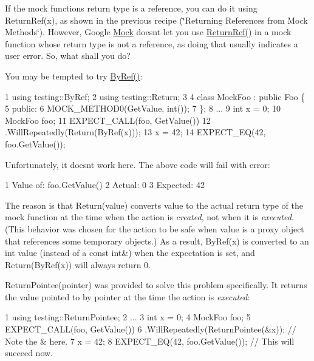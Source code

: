 If the mock function\textquotesingle{}s return type is a reference, you can do it using {\ttfamily Return\+Ref(x)}, as shown in the previous recipe (\char`\"{}\+Returning References
from Mock Methods\char`\"{}). However, Google \hyperlink{class_mock}{Mock} doesn\textquotesingle{}t let you use {\ttfamily \hyperlink{namespacetesting_a18eda8fe9c89ee856c199a2e04ca1641}{Return\+Ref()}} in a mock function whose return type is not a reference, as doing that usually indicates a user error. So, what shall you do?

You may be tempted to try {\ttfamily \hyperlink{namespacetesting_aaee6d42dcd69de6e7a1459c5c71222c3}{By\+Ref()}}\+:


\begin{DoxyCode}
1 using testing::ByRef;
2 using testing::Return;
3 
4 class MockFoo : public Foo \{
5  public:
6   MOCK\_METHOD0(GetValue, int());
7 \};
8 ...
9   int x = 0;
10   MockFoo foo;
11   EXPECT\_CALL(foo, GetValue())
12       .WillRepeatedly(Return(ByRef(x)));
13   x = 42;
14   EXPECT\_EQ(42, foo.GetValue());
\end{DoxyCode}


Unfortunately, it doesn\textquotesingle{}t work here. The above code will fail with error\+:


\begin{DoxyCode}
1 Value of: foo.GetValue()
2   Actual: 0
3 Expected: 42
\end{DoxyCode}


The reason is that {\ttfamily Return(value)} converts {\ttfamily value} to the actual return type of the mock function at the time when the action is {\itshape created}, not when it is {\itshape executed}. (This behavior was chosen for the action to be safe when {\ttfamily value} is a proxy object that references some temporary objects.) As a result, {\ttfamily By\+Ref(x)} is converted to an {\ttfamily int} value (instead of a {\ttfamily const int\&}) when the expectation is set, and {\ttfamily Return(\+By\+Ref(x))} will always return 0.

{\ttfamily Return\+Pointee(pointer)} was provided to solve this problem specifically. It returns the value pointed to by {\ttfamily pointer} at the time the action is {\itshape executed}\+:


\begin{DoxyCode}
1 using testing::ReturnPointee;
2 ...
3   int x = 0;
4   MockFoo foo;
5   EXPECT\_CALL(foo, GetValue())
6       .WillRepeatedly(ReturnPointee(&x));  // Note the & here.
7   x = 42;
8   EXPECT\_EQ(42, foo.GetValue());  // This will succeed now.
\end{DoxyCode}


